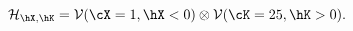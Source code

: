 \begin{equation}
%
{{\cal H}_{\hX,\hK} = \cal V}(\cX=1, \hX<0) \otimes {\cal V}(\cK=25, \hK>0).
\label{eq:hilbert}
%
\end{equation}

